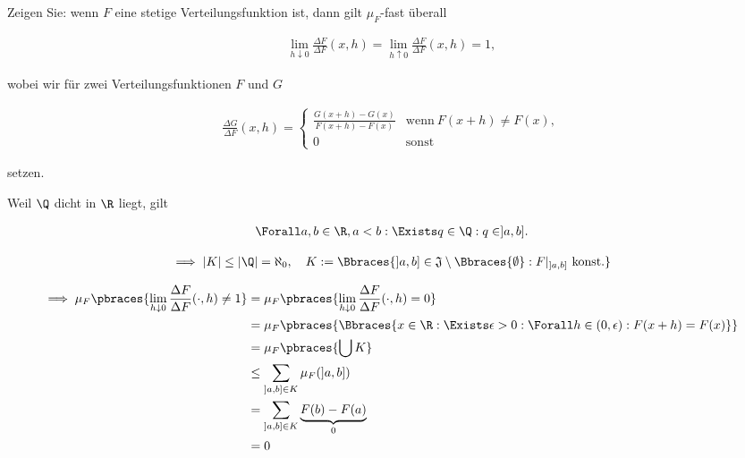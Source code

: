 
\begin{exercise}

Zeigen Sie:
wenn $F$ eine stetige Verteilungsfunktion ist, dann gilt $\mu_F$-fast überall

\begin{align*}
    \lim_{h \downarrow 0}
        \frac{\Delta F}{\Delta F}(x, h)
    =
    \lim_{h \uparrow 0}
        \frac{\Delta F}{\Delta F}(x, h)
    =
    1,
\end{align*}

wobei wir für zwei Verteilungsfunktionen $F$ und $G$

\begin{align*}
    \frac{\Delta G}{\Delta F}(x, h)
    =
    \begin{cases}
        \frac{G(x + h) - G(x)}{F(x + h) - F(x)} & \text{wenn}~ F(x + h) \neq F(x), \\
        0                                       & \text{sonst}
    \end{cases}
\end{align*}

setzen.

\end{exercise}


\begin{solution}

Weil $\Q$ dicht in $\R$ liegt, gilt

\begin{align*}
    \Forall a, b \in \R, a < b:
        \Exists q \in \Q:
            q \in ]a, b].
\end{align*}

\begin{align*}
    \implies
    |K| \leq |\Q| = \aleph_0,
    \quad
    K := \Bbraces{]a, b] \in \mathfrak J \setminus \Bbraces{\emptyset}: F |_{]a, b]} ~\text{konst.}}
\end{align*}

\begin{align*}
    \implies
    \mu_F \pbraces{\lim_{h \downarrow 0} \frac{\Delta F}{\Delta F}(\cdot, h) \neq 1}
    & =
    \mu_F \pbraces{\lim_{h \downarrow 0} \frac{\Delta F}{\Delta F}(\cdot, h) = 0} \\
    & =
    \mu_F \pbraces{\Bbraces{x \in \R: \Exists \epsilon > 0: \Forall h \in (0, \epsilon): F(x + h) = F(x)}} \\
    & =
    \mu_F \pbraces{\bigcup K} \\
    & \leq
    \sum_{{]a, b]} \in K}
        \mu_F(]a, b]) \\
    & =
    \sum_{{]a, b]} \in K}
        \underbrace{F(b) - F(a)}_0 \\
    & =
    0
\end{align*}

\end{solution}

